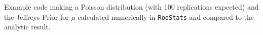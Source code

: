 Example code making a Poisson distribution (with 100 replications expected) and the Jeffreys Prior for $\mu$ calculated numerically in \texttt{RooStats} and compared to the analytic result.  